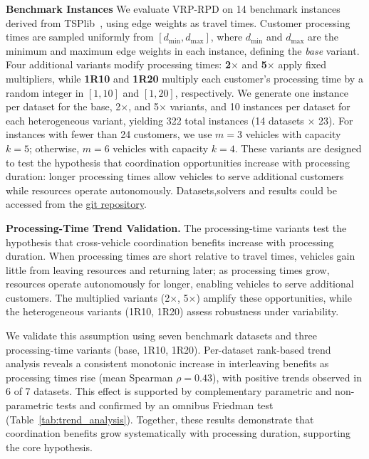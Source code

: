 \documentclass[sigconf]{acmart}
\begin{document}
\textbf{Benchmark Instances} We evaluate VRP-RPD on 14 benchmark instances derived from TSPlib~\cite{reinelt1991tsplib}, using edge weights as travel times. Customer processing times are sampled uniformly from $[d_{\min}, d_{\max}]$, where $d_{\min}$ and $d_{\max}$ are the minimum and maximum edge weights in each instance, defining the \emph{base} variant. Four additional variants modify processing times: \textbf{2$\times$} and \textbf{5$\times$} apply fixed multipliers, while \textbf{1R10} and \textbf{1R20} multiply each customer’s processing time by a random integer in $[1,10]$ and $[1,20]$, respectively. We generate one instance per dataset for the base, 2$\times$, and 5$\times$ variants, and 10 instances per dataset for each heterogeneous variant, yielding 322 total instances (14 datasets $\times$ 23). For instances with fewer than 24 customers, we use $m=3$ vehicles with capacity $k=5$; otherwise, $m=6$ vehicles with capacity $k=4$. These variants are designed to test the hypothesis that coordination opportunities increase with processing duration: longer processing times allow vehicles to serve additional customers while resources operate autonomously. Datasets,solvers and results could be accessed from the \href{https://github.com/romeshprasad/vrp_rpd}{git repository}.

\textbf{Processing-Time Trend Validation.}
The processing-time variants test the hypothesis that cross-vehicle coordination benefits increase with processing duration. When processing times are short relative to travel times, vehicles gain little from leaving resources and returning later; as processing times grow, resources operate autonomously for longer, enabling vehicles to serve additional customers. The multiplied variants (2$\times$, 5$\times$) amplify these opportunities, while the heterogeneous variants (1R10, 1R20) assess robustness under variability.

We validate this assumption using seven benchmark datasets and three processing-time variants (base, 1R10, 1R20). Per-dataset rank-based trend analysis reveals a consistent monotonic increase in interleaving benefits as processing times rise (mean Spearman $\rho = 0.43$), with positive trends observed in 6 of 7 datasets. This effect is supported by complementary parametric and non-parametric tests and confirmed by an omnibus Friedman test (Table~\ref{tab:trend_analysis}). Together, these results demonstrate that coordination benefits grow systematically with processing duration, supporting the core hypothesis.
\end{document}

